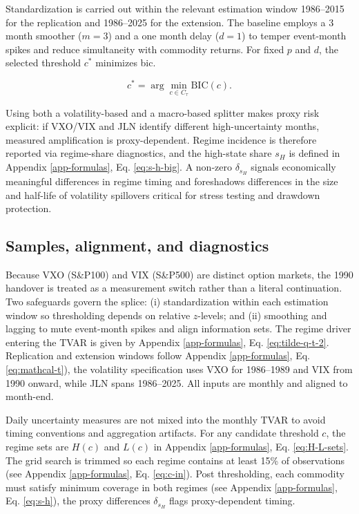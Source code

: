 \documentclass[
  11pt,
]{article}
\begin{document}
Standardization is carried out within the relevant estimation window 1986--2015 for the replication and 1986--2025 for the extension. The baseline employs a 3 month smoother (\(m=3\)) and a one month delay (\(d=1\)) to temper event-month spikes and reduce simultaneity with commodity returns. For fixed \(p\) and \(d\), the selected threshold \(c^*\) minimizes \ac{bic}.

\begin{equation}\label{eq:c-star-argmin}
c^{*} = \arg\min_{c \in C_{\tau}} \mathrm{BIC}(c).
\end{equation}

Using both a volatility-based and a macro-based splitter makes proxy risk explicit: if VXO/VIX and JLN identify different high-uncertainty months, measured amplification is proxy-dependent. Regime incidence is therefore reported via regime-share diagnostics, and the high-state share \(s_H\) is defined in Appendix \ref{app-formulas}, Eq. \eqref{eq:s-h-big}.
A non-zero \(\delta_{s_H}\) signals economically meaningful differences in regime timing and foreshadows differences in the size and half-life of volatility spillovers critical for stress testing and drawdown protection.

\subsection{Samples, alignment, and diagnostics}\label{sec:datathree}

Because VXO (S\&P100) and VIX (S\&P500) are distinct option markets, the 1990 handover is treated as a measurement switch rather than a literal continuation. Two safeguards govern the splice: (i) standardization within each estimation window so thresholding depends on relative \(z\)-levels; and (ii) smoothing and lagging to mute event-month spikes and align information sets. The regime driver entering the TVAR is given by Appendix \ref{app-formulas}, Eq. \eqref{eq:tilde-q-t-2}. Replication and extension windows follow Appendix \ref{app-formulas}, Eq. \eqref{eq:mathcal-t}), the volatility specification uses VXO for 1986--1989 and VIX from 1990 onward, while JLN spans 1986--2025. All inputs are monthly and aligned to month-end.

Daily uncertainty measures are not mixed into the monthly TVAR to avoid timing conventions and aggregation artifacts. For any candidate threshold \(c\), the regime sets are \(H(c)\) and \(L(c)\) in Appendix \ref{app-formulas}, Eq. \eqref{eq:H-L-sets}. The grid search is trimmed so each regime contains at least 15\% of observations (see Appendix \ref{app-formulas}, Eq. \eqref{eq:c-in}). Post thresholding, each commodity must satisfy minimum coverage in both regimes (see Appendix \ref{app-formulas}, Eq. \eqref{eq:s-h}), the proxy differences \(\delta_{s_H}\) flags proxy-dependent timing.
\end{document}
